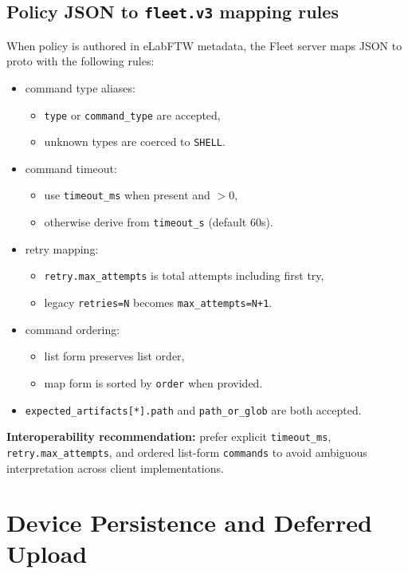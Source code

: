 \documentclass[11pt,a4paper]{article}
\begin{document}
\subsection{Policy JSON to \texttt{fleet.v3} mapping rules}
When policy is authored in eLabFTW metadata, the Fleet server maps JSON to proto with the following rules:
\begin{itemize}
  \item command type aliases:
    \begin{itemize}
      \item \texttt{type} or \texttt{command\_type} are accepted,
      \item unknown types are coerced to \texttt{SHELL}.
    \end{itemize}
  \item command timeout:
    \begin{itemize}
      \item use \texttt{timeout\_ms} when present and $>0$,
      \item otherwise derive from \texttt{timeout\_s} (default 60s).
    \end{itemize}
  \item retry mapping:
    \begin{itemize}
      \item \texttt{retry.max\_attempts} is total attempts including first try,
      \item legacy \texttt{retries=N} becomes \texttt{max\_attempts=N+1}.
    \end{itemize}
  \item command ordering:
    \begin{itemize}
      \item list form preserves list order,
      \item map form is sorted by \texttt{order} when provided.
    \end{itemize}
  \item \texttt{expected\_artifacts[*].path} and \texttt{path\_or\_glob} are both accepted.
\end{itemize}

\textbf{Interoperability recommendation:}
prefer explicit \texttt{timeout\_ms}, \texttt{retry.max\_attempts}, and ordered list-form \texttt{commands} to avoid ambiguous interpretation across client implementations.

\section{Device Persistence and Deferred Upload}
\end{document}
